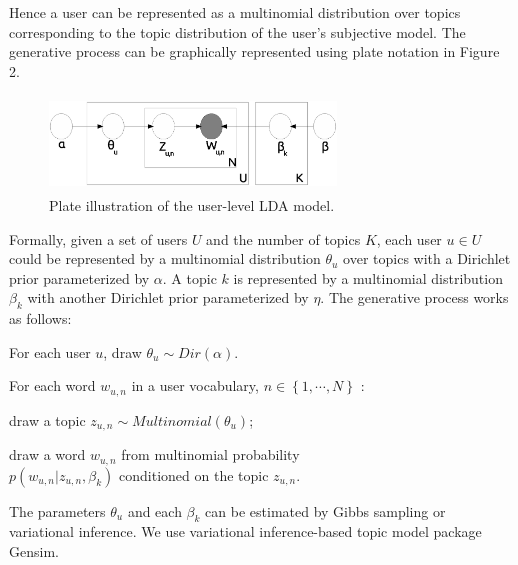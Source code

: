 \documentclass{acm_proc_article-sp}
\begin{document}
Hence a user can be represented as a multinomial distribution over topics corresponding to the topic distribution of the user's subjective model.
The generative process can be graphically represented using plate notation in Figure 2. 
\begin{figure}
\centering
\includegraphics[width=3.0in,height=1.0in]{LDA.eps}
\caption{Plate illustration of the user-level LDA model.}
\label{fig:graph2}
\end{figure}
Formally, given a set of users $ U $ and the number of topics $ K $, each user $ u \in U $ could be represented by a multinomial distribution $ \theta_{u} $ over topics with a Dirichlet prior parameterized by $ \alpha $. 
A topic $ k $ is represented by a multinomial distribution $ \beta_{k} $ with another Dirichlet prior parameterized by $ \eta $. 
The generative process works as follows:
\begin{itemize*}
\item For each user $ u $, draw $ \theta_{u} \sim Dir \left(  \alpha \right) $.
\item For each word $ w_{u,n} $ in a user vocabulary, $ n \in \left\lbrace 1, \cdots, N \right\rbrace $ :
\begin{itemize*}
\item draw a topic $ z_{u,n} \sim Multinomial \left( \theta_{u}  \right) $;
\item draw a word $ w_{u,n} $ from multinomial probability \\$  p \left( w_{u,n} \vert z_{u,n}, \beta_{k}  \right) $ conditioned on the topic $ z_{u,n} $.
\end{itemize*}
\end{itemize*}
The parameters $ \theta_{u} $ and each $ \beta_{k} $ can be estimated by Gibbs sampling or variational inference.
We use variational inference-based topic model package Gensim\cite{rehurek_lrec}.
\end{document}
